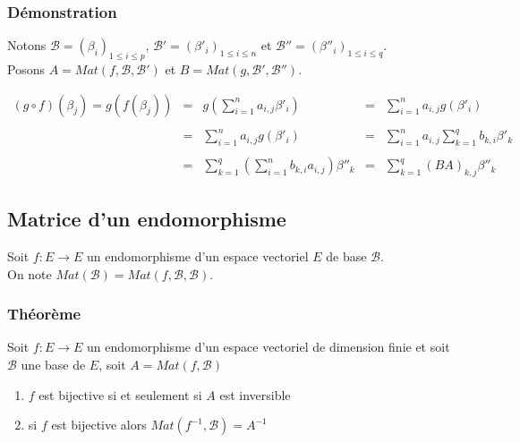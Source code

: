 \documentclass[a4paper,10pt]{book} %
\newcommand{\B}{\mathcal{B}}
\begin{document}
\subsubsection{Démonstration}
Notons $\B=(\beta_i)_{1\leq i\leq p}$, $\B'=(\beta'_i)_{1\leq i\leq n}$ et $\B''=(\beta''_i)_{1\leq i\leq q}$.\\
Posons $A=Mat(f,\B,\B')$ et $B=Mat(g,\B',\B'')$.\\
\begin{spacing}{0.2}$$\begin{array}{rcccl}(g\circ f)(\beta_j) =g(f(\beta_j)) &=& g(\displaystyle\sum\limits_{i=1}^na_{i,j}\beta'_i) &=&\displaystyle\sum\limits_{i=1}^n a_{i,j}g(\beta'_i)\\\\
&=&\displaystyle\sum\limits_{i=1}^na_{i,j}g(\beta'_{i}) &=&\displaystyle\sum\limits_{i=1}^na_{i,j}\sum\limits_{k=1}^qb_{k,i}\beta'_k\\\\
&=&\displaystyle\sum\limits_{k=1}^q(\sum\limits_{i=1}^nb_{k,i}a_{i,j})\beta''_k &=&\displaystyle\sum\limits_{k=1}^q(BA)_{k,j}\beta''_k\end{array}$$\end{spacing}

\newpage

\subsection{Matrice d'un endomorphisme}
Soit $f:E\rightarrow E$ un endomorphisme d'un espace vectoriel $E$ de base $\B$.\\
On note $Mat(\B)=Mat(f,\B,\B)$.

\subsubsection{Théorème}
Soit $f: E\rightarrow E$ un endomorphisme d'un espace vectoriel de dimension finie et soit $\B$ une base de $E$, soit $A=Mat(f,\B)$
\begin{enumerate}
\item $f$ est bijective si et seulement si $A$ est inversible
\item si $f$ est bijective alors $Mat(f^{-1},\B)=A^{-1}$
\end{enumerate}
\end{document}
